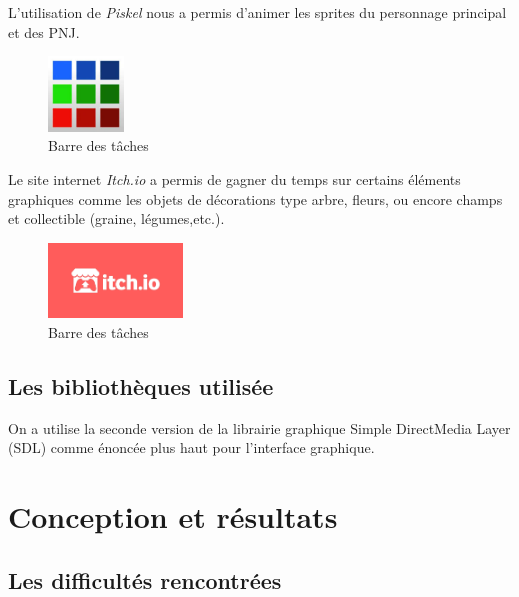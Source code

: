 \documentclass{article}
\begin{document}
    L'utilisation de \textit{Piskel} nous a permis d'animer les sprites du personnage principal et des PNJ.

\begin{figure}[h]  
\includegraphics[height = 2cm]{piskel.jpeg}
\centering
\caption{Barre des tâches}
\label{fig:logo2}
\end{figure}



Le site internet \textit{Itch.io} a permis de gagner du temps sur certains éléments graphiques comme les objets de décorations type arbre, fleurs, ou encore champs et collectible (graine, légumes,etc.). 
    
    \begin{figure}[h]  
        \includegraphics[height = 2cm]{itch.io.png}
        \centering
        \caption{Barre des tâches}
        \label{fig:logo3}
    \end{figure}

\subsection{Les bibliothèques utilisée}
On a utilise la seconde version de la librairie graphique Simple DirectMedia Layer (SDL) comme énoncée plus haut pour l'interface graphique.

\newpage
\section{Conception et résultats}
\subsection{Les difficultés rencontrées}
\end{document}
